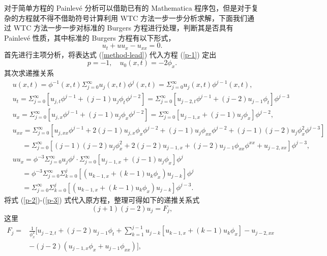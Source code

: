 对于简单方程的 Painlev\'{e} 分析可以借助已有的 Mathematica 程序包，但是对于复杂的方程就不得不借助符号计算利用 WTC 方法一步一步分析求解，下面我们通过 WTC 方法一步一步对标准的 Burgers 方程进行处理，判断其是否具有 Painlev\'{e} 性质，其中标准的 Burgers 方程有以下形式，
\begin{equation}
u_t + u u_x - u_{xx}=0.\label{p-1}
\end{equation}
首先进行主项分析，将表达式 (\ref{method-lead}) 代入方程 (\ref{p-1}) 定出
\begin{equation}
p=-1, \quad u_0(x,t)=-2 \phi_x.\nonumber
\end{equation}
其次求递推关系
\begin{align}
&u(x,t)=\phi^{-1}(x,t)\Sigma_{j=0}^{\infty}u_j(x,t)\phi^j(x,t)=\Sigma_{j=0}^{\infty}u_j(x,t)\phi^{j-1}(x,t),\label{p-2}\\
&u_t=\Sigma_{j=0}^{\infty}[u_{j,t}\phi^{j-1}+(j-1)u_j\phi_t\phi^{j-2}]=\Sigma_{j=0}^{\infty}[u_{j-2,t}\phi^{j-1}+(j-2)u_{j-1}\phi_t]\phi^{j-3}\nonumber\\
&u_x=\Sigma_{j=0}^{\infty}[u_{j,x}\phi^{j-1}+(j-1)u_j\phi_x\phi^{j-2}]=\Sigma_{j=0}^{\infty}[u_{j-1,x}+(j-1)u_{j}\phi_x]\phi^{j-2},\nonumber\\
&u_{xx}=\Sigma_{j=0}^{\infty}[u_{j,xx}\phi^{j-1}+2(j-1)u_{j,x}\phi_x\phi^{j-2}+(j-1)u_j\phi_{xx}\phi^{j-2}+(j-1)(j-2)u_j\phi_x^2\phi^{j-3}]\nonumber\\
&~~~~~~=\Sigma_{j=0}^{\infty}[(j-1)(j-2)u_{j}\phi_x^2+2(j-2)u_{j-1,x}+(j-2)u_{j-1}\phi_{xx}\phi^{xx}+u_{j-2,xx}]\phi^{j-3},\nonumber\\
&uu_x=\phi^{-3}\Sigma_{j=0}^{\infty}u_j\phi^j\cdotp \Sigma_{j=0}^{\infty}[u_{j-1,x}+(j-1)u_j\phi_x]\phi^j\nonumber\\
&~~~~~~=\phi^{-3}\Sigma_{j=0}^{\infty}\Sigma_{k=0}^{j}[(u_{k-1,x}+(k-1)u_k\phi_x)u_{j-k}]\phi^j\nonumber\\
&~~~~~~=\Sigma_{j=0}^{\infty}\Sigma_{k=0}^{j}[(u_{k-1,x}+(k-1)u_k\phi_x)u_{j-k}]\phi^{j-3}.\label{p-3}
\end{align}
将式 (\ref{p-2})-(\ref{p-3}) 式代入原方程，整理可得如下的递推关系式
\begin{equation}
(j+1)(j-2)u_j=F_j,\label{p-4}
\end{equation}
这里
\begin{align}
F_j=&\frac{1}{\phi_x^2}\big[ u_{j-2,t} + (j-2) u_{j-1}\phi_t +\sum^{j-1}_{k=1} u_{j-k} [ u_{k-1,x} +
(k-1) u_k \phi_x] -u_{j-2,xx} \nonumber\\
&- (j-2)(u_{j-1,x} \phi_x +u_{j-1} \phi_{xx}) \big],\nonumber
\end{align}
